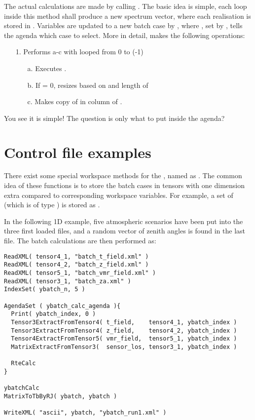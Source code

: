 The actual calculations are made by calling . The
basic idea is simple, each loop inside this method shall produce a new
spectrum vector, where each realisation is stored in
. Variables are updated to a new batch case by
, where , set
by , tells the agenda which case to select.
More in detail,  makes the following operations:

\begin{itemize}

\item[1.] Performs a-c with  looped from 0
to (-1)

\begin{itemize}
\item[a.] Executes .
\item[b.] If  = 0, resizes
 based
on  and length of  
\item[c.] Makes copy of  in column  of .
\end{itemize}

\end{itemize}

You see it is simple! The question is only what to put inside the
agenda?


\section{Control file examples}
%
There exist some special workspace methods for the
, named as
.  The common idea of these functions is to
store the batch cases in tensors with one dimension extra compared to
corresponding workspace variables. For example, a set of
 (which is of type ) is stored
as .

In the following 1D example, five atmospheric scenarios
have been put into the three first loaded files, and a random vector
of zenith angles is found in the last file. The batch calculations
are then performed as:

\begin{verbatim}
ReadXML( tensor4_1, "batch_t_field.xml" )
ReadXML( tensor4_2, "batch_z_field.xml" )
ReadXML( tensor5_1, "batch_vmr_field.xml" )
ReadXML( tensor3_1, "batch_za.xml" )
IndexSet( ybatch_n, 5 )

AgendaSet ( ybatch_calc_agenda ){
  Print( ybatch_index, 0 )
  Tensor3ExtractFromTensor4( t_field,    tensor4_1, ybatch_index )
  Tensor3ExtractFromTensor4( z_field,    tensor4_2, ybatch_index )
  Tensor4ExtractFromTensor5( vmr_field,  tensor5_1, ybatch_index )
  MatrixExtractFromTensor3(  sensor_los, tensor3_1, ybatch_index )

  RteCalc
}

ybatchCalc
MatrixToTbByRJ( ybatch, ybatch )

WriteXML( "ascii", ybatch, "ybatch_run1.xml" )
\end{verbatim}

